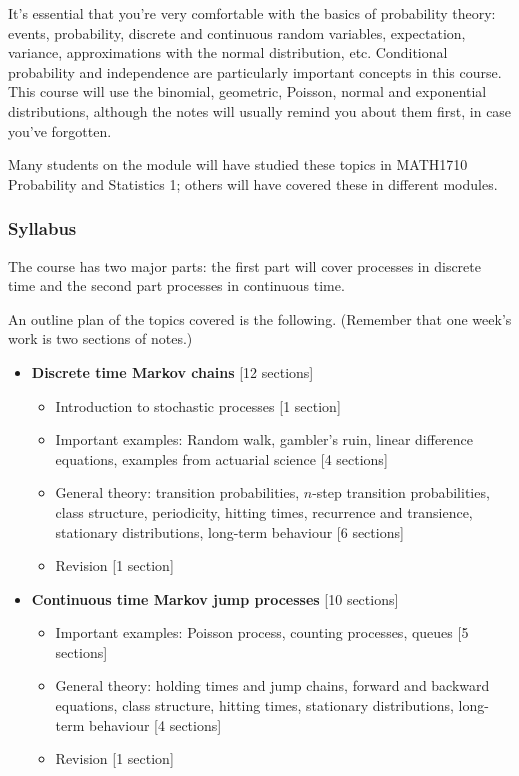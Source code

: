 \documentclass[
  a4paper,
]{article}
\providecommand{\tightlist}{%
  \setlength{\itemsep}{0pt}\setlength{\parskip}{0pt}}
\theoremstyle{definition}
\theoremstyle{definition}
\theoremstyle{definition}
\theoremstyle{remark}
\begin{document}
It's essential that you're very comfortable with the basics of probability theory: events, probability, discrete and continuous random variables, expectation, variance, approximations with the normal distribution, etc. Conditional probability and independence are particularly important concepts in this course. This course will use the binomial, geometric, Poisson, normal and exponential distributions, although the notes will usually remind you about them first, in case you've forgotten.

Many students on the module will have studied these topics in MATH1710 Probability and Statistics 1; others will have covered these in different modules.

\hypertarget{syllabus}{%
\subsubsection*{Syllabus}\label{syllabus}}

The course has two major parts: the first part will cover processes in discrete time and the second part processes in continuous time.

An outline plan of the topics covered is the following. (Remember that one week's work is two sections of notes.)

\begin{itemize}
\tightlist
\item
  \textbf{Discrete time Markov chains} {[}12 sections{]}

  \begin{itemize}
  \tightlist
  \item
    Introduction to stochastic processes {[}1 section{]}
  \item
    Important examples: Random walk, gambler's ruin, linear difference equations, examples from actuarial science {[}4 sections{]}
  \item
    General theory: transition probabilities, \(n\)-step transition probabilities, class structure, periodicity, hitting times, recurrence and transience, stationary distributions, long-term behaviour {[}6 sections{]}
  \item
    Revision {[}1 section{]}
  \end{itemize}
\item
  \textbf{Continuous time Markov jump processes} {[}10 sections{]}

  \begin{itemize}
  \tightlist
  \item
    Important examples: Poisson process, counting processes, queues {[}5 sections{]}
  \item
    General theory: holding times and jump chains, forward and backward equations, class structure, hitting times, stationary distributions, long-term behaviour {[}4 sections{]}
  \item
    Revision {[}1 section{]}
  \end{itemize}
\end{itemize}
\end{document}
